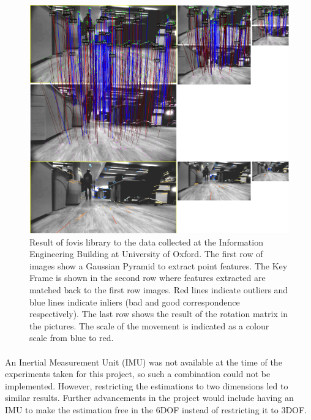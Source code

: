 \documentclass[11pt]{article}
\begin{document}
	\begin{figure}
	\begin{minipage}{0.65\textwidth}
		\centering
		\includegraphics[width=\textwidth]{VisualOdometry1}
	\end{minipage} \hfill
	\begin{minipage}{0.35\textwidth}
		\centering
		\caption[t]{Result of fovis library to the data collected at the Information Engineering Building at University of Oxford. The first row of images show a Gaussian Pyramid to extract point features. The Key Frame is shown in the second row where features extracted are matched back to the first row images. Red lines indicate outliers and blue lines indicate inliers (bad and good correspondence respectively). The last row shows the result of the rotation matrix in the pictures. The scale of the movement is indicated as a colour scale from blue to red.}
			\label{fig:VisualOdometry1}	
	\end{minipage}				
	\end{figure}
		
	\paragraph{}
	An Inertial Measurement Unit (IMU) was not available at the time of the experiments taken for this project, so such a combination could not be implemented. However, restricting the estimations to two dimensions led to similar results. Further advancements in the project would include having an IMU to make the estimation free in the 6DOF instead of restricting it to 3DOF.
	
\end{document}
